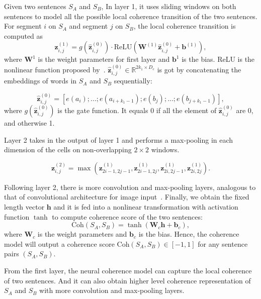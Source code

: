 \documentclass[letterpaper]{article} %
\begin{document}
	Given two sentences $S_A$ and $S_B$, In layer 1, it uses sliding windows on both sentences to model all the possible local coherence transition of the two sentences. For segment $i$ on $S_A$ and segment $j$ on $S_B$, the local coherence transition is computed as
	\begin{equation*}
	\mathbf{z}^{(1)}_{i,j}  = g(\hat{\mathbf{z}}^{(0)}_{i,j})\cdot \text{ReLU}(\mathbf{W}^{(1)} \hat{\mathbf{z}}^{(0)}_{i,j} + \mathbf{b}^{(1)}),
	\end{equation*}
	where $\mathbf{W}^1$ is the weight parameters for first layer and $\mathbf{b}^1$ is the bias. ReLU is the nonlinear function proposed by~\cite{relu}. $\hat{\mathbf{z}}^{(0)}_{i,j} \in \mathbb{R}^{2k_1 \times D_{e}}$ is got by concatenating the embeddings of words in $S_A$ and $S_B$ sequentially:
	
	\begin{equation*}
	\hat{\mathbf{z}}^{(0)}_{i,j} =  [e(a_i); ... ; e(a_{i+k_1-1}); e(b_j);...; e(b_{j+k_1-1})],
	\end{equation*}
	where $g(\hat{\mathbf{z}}^{(0)}_{i,j})$ is the gate function. It equals 0 if all the element of $\hat{\mathbf{z}}^{(0)}_{i,j}$ are 0, and otherwise 1.
	
	Layer 2 takes in the output of layer 1 and performs a max-pooling in each dimension of the cells on non-overlapping $2\times 2$ windows.
	
	
	\begin{equation*}
	\mathbf{z}_{i,j}^{(2)} = \max(\mathbf{z}_{2i-1,2j-1}^{(1)}, \mathbf{z}_{2i-1,2j}^{(1)},\mathbf{z}_{2i,2j-1}^{(1)},\mathbf{z}_{2i,2j}^{(1)}). 
	\end{equation*}
	
	Following layer 2, there is more convolution and  max-pooling layers, analogous to that of convolutional architecture for image input~\cite{cnn}. Finally, we obtain the fixed length vector $\mathbf{h}$ and it is fed into a nonlinear transformation with activation function $\tanh$ to compute coherence score of the two sentences:
	\begin{equation}\label{eq:coh}
	\text{Coh}(S_A,S_B) = \tanh(\mathbf{W}_c  \mathbf{h}+ \mathbf{b}_c), 
	\end{equation}
	where $\mathbf{W}_c$ is the weight parameters and $\mathbf{b}_c$ is the bias. Hence, the coherence model will output a coherence score  $\text{Coh}(S_A, S_B) \in [-1,1]$ for any sentence pairs $(S_A, S_B)$.
	
	From the first layer, the neural coherence model can capture the local coherence of two sentences.  And it can also obtain higher level coherence representation of $S_A$ and $S_B$ with more convolution and max-pooling layers.
	
\end{document}
